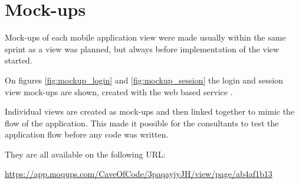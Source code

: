 \section{Mock-ups}
Mock-ups of each mobile application view were made usually within the same sprint as a view was planned, but always before implementation of the view started.

On figures \ref{fig:mockup_login} and \ref{fig:mockup_session} the login and session view mock-ups are shown, created with the web based service .

Individual views are created as mock-ups and then linked together to mimic the flow of the application. 
This made it possible for the consultants to test the application flow before any code was written.

They are all available on the following URL: 

\url{https://app.moqups.com/CaveOfCode/3paqayjyJH/view/page/ab4af1b13}


